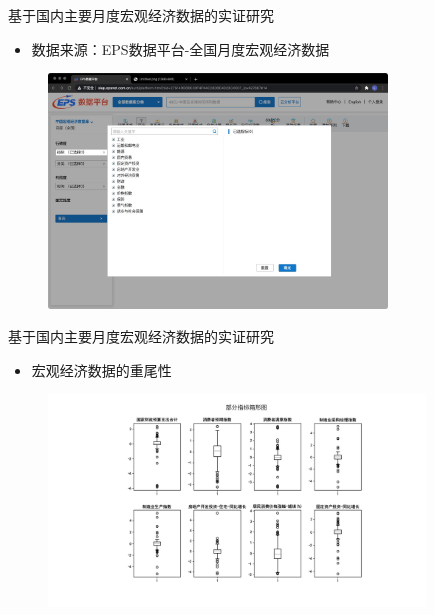 \begin{frame}{基于国内主要月度宏观经济数据的实证研究}
    \begin{itemize}
        \item
        数据来源：EPS数据平台-全国月度宏观经济数据
    \end{itemize}
    \begin{figure}[H]
        \includegraphics[width=9cm]{pics/eps-data.png}
    \end{figure}
\end{frame}

\begin{frame}{基于国内主要月度宏观经济数据的实证研究}
    \begin{itemize}
        \item
        宏观经济数据的重尾性
    \end{itemize}
    \begin{figure}[H]
        \includegraphics[width=10cm]{pics/box.pdf}
    \end{figure}
\end{frame}

